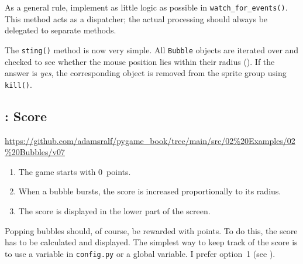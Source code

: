 \begin{hintbox}
	As a general rule, implement as little logic as possible in \texttt{watch\_\-for\_\-events()}. This method acts as a dispatcher; the actual processing should always be delegated to separate methods.
\end{hintbox}


The \texttt{sting()} method is now very simple. All \texttt{Bubble} objects are iterated over and checked to see whether the mouse position lies within their radius (). If the answer is \emph{yes}, the corresponding object is removed from the sprite group using \texttt{kill()}.


\subsection{: Score}
\begin{diskbox}
	\url{https://github.com/adamsralf/pygame_book/tree/main/src/02%20Examples/02%20Bubbles/v07}
\end{diskbox}

\begin{enumerate}
	\item The game starts with 0~points.\label{reqPunktestandNull}
	\item When a bubble bursts, the score is increased proportionally to its radius.\label{reqPunktestandRadius}
	\item The score is displayed in the lower part of the screen.\label{reqPunktestandAnzeige}
\end{enumerate}
\er

Popping bubbles should, of course, be rewarded with points. To do this, the score has to be calculated and displayed. The simplest way to keep track of the score is to use a variable in \texttt{config.py} or a global variable. I prefer option~1 (see ).

